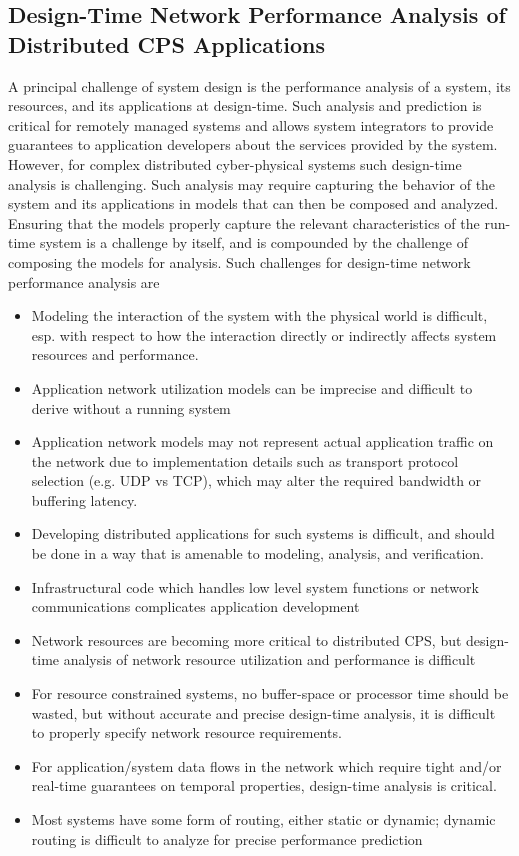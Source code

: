 \subsection{Design-Time Network Performance Analysis of Distributed CPS Applications}
A principal challenge of system design is the performance analysis of a system, its resources, and its applications at design-time.  Such analysis and prediction is critical for remotely managed systems and allows system integrators to provide guarantees to application developers about the services provided by the system.  However, for complex distributed cyber-physical systems such design-time analysis is challenging.  Such analysis may require capturing the behavior of the system and its applications in models that can then be composed and analyzed.  Ensuring that the models properly capture the relevant characteristics of the run-time system is a challenge by itself, and is compounded by the challenge of composing the models for analysis.  Such challenges for design-time network performance analysis are
\begin{itemize}
	\item Modeling the interaction of the system with the physical world is difficult, esp. with respect to how the interaction directly or indirectly affects system resources and performance.
	\item Application network utilization models can be imprecise and difficult to derive without a running system
	\item Application network models may not represent actual application traffic on the network due to implementation details such as transport protocol selection (e.g. UDP vs TCP), which may alter the required bandwidth or buffering latency.
	\item Developing distributed applications for such systems is difficult, and should be done in a way that is amenable to modeling, analysis, and verification.
	\item Infrastructural code which handles low level system functions or network communications complicates application development
	\item Network resources are becoming more critical to distributed CPS, but design-time analysis of network resource utilization and performance is difficult
	\item For resource constrained systems, no buffer-space or processor time should be wasted, but without accurate and precise design-time analysis, it is difficult to properly specify network resource requirements.
	\item For application/system data flows in the network which require tight and/or real-time guarantees on temporal properties, design-time analysis is critical.
	\item Most systems have some form of routing, either static or dynamic; dynamic routing is difficult to analyze for precise performance prediction
\end{itemize}

